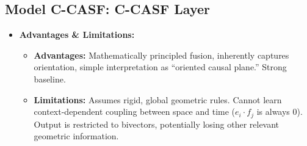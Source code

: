 \documentclass[11pt]{article}
\newenvironment{modeldescription}[1]{%
    \subsection*{Model #1: \MakeUppercase{#1} Layer}%
    \begin{itemize}[leftmargin=*,noitemsep]%
}{%
    \end{itemize}%
}
\begin{document}
\begin{modeldescription}{C-CASF}
    \item \textbf{Advantages \& Limitations:}
    \begin{itemize}[noitemsep]
        \item \textbf{Advantages:} Mathematically principled fusion, inherently captures orientation, simple interpretation as ``oriented causal plane.'' Strong baseline.
        \item \textbf{Limitations:} Assumes rigid, global geometric rules. Cannot learn context-dependent coupling between space and time ($e_i \cdot f_j$ is always 0). Output is restricted to bivectors, potentially losing other relevant geometric information.
    \end{itemize}
\end{modeldescription}

\clearpage
\end{document}
